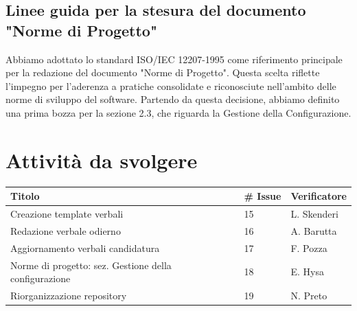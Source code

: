 \documentclass{article}
\begin{document}
    \subsection{Linee guida per la stesura del documento "Norme di Progetto"}
        Abbiamo adottato lo standard ISO/IEC 12207-1995 come riferimento principale per la redazione del documento "Norme di Progetto". Questa scelta riflette l'impegno per l'aderenza a pratiche consolidate e riconosciute nell'ambito delle norme di sviluppo del software.
        Partendo da questa decisione, abbiamo definito una prima bozza per la sezione 2.3, che riguarda la Gestione della Configurazione.  

\section{Attività da svolgere}
    \begin{center}
        \begin{tabular}{|C{7cm}|C{1,5cm}|C{3cm}|}
            \hline
            \textbf{Titolo} & \textbf{\# Issue} & \textbf{Verificatore} \\
            \hline\hline
            Creazione template verbali & 15 & L. Skenderi \\  
            Redazione verbale odierno & 16 & A. Barutta \\  
            Aggiornamento verbali candidatura & 17 & F. Pozza \\  
            Norme di progetto: sez. Gestione della configurazione & 18 & E. Hysa \\  
            Riorganizzazione repository & 19 & N. Preto \\  
            \hline
        \end{tabular}
    \end{center}
\end{document}
